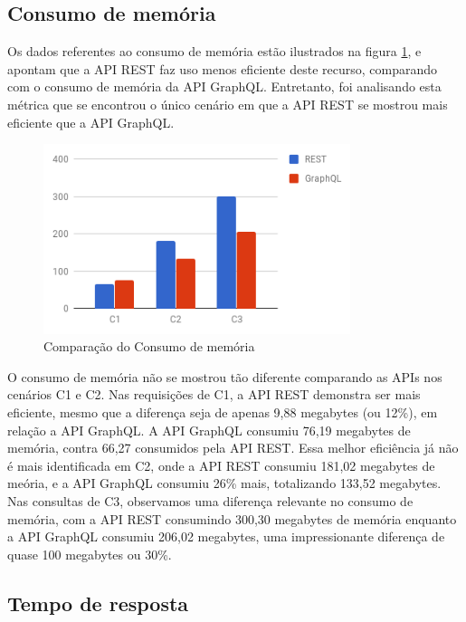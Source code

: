 \subsection{Consumo de memória}

Os dados referentes ao consumo de memória estão ilustrados na figura \ref{fig:q2-mem}, e apontam que a API REST faz uso menos eficiente deste recurso, comparando com o consumo de memória da API GraphQL. Entretanto, foi analisando esta métrica que se encontrou o único cenário em que a API REST se mostrou mais eficiente que a API GraphQL.

\begin{figure}[htbp]
    \centering
    \includegraphics[width=0.8\textwidth]{figuras/q2-memory.png}
    \caption{Comparação do Consumo de memória}
    \label{fig:q2-mem}
    \author{fonte: Autor}
\end{figure}

O consumo de memória não se mostrou tão diferente comparando as APIs nos cenários C1 e C2. Nas requisições de C1, a API REST demonstra ser mais eficiente, mesmo que a diferença seja de apenas 9,88 megabytes (ou 12\%), em relação a API GraphQL. A API GraphQL consumiu 76,19 megabytes de memória, contra 66,27 consumidos pela API REST. Essa melhor eficiência já não é mais identificada em C2, onde a API REST consumiu 181,02 megabytes de meória, e a API GraphQL consumiu 26\% mais, totalizando 133,52 megabytes. Nas consultas de C3, observamos uma diferença relevante no consumo de memória, com a API REST consumindo 300,30 megabytes de memória enquanto a API GraphQL consumiu 206,02 megabytes, uma impressionante diferença de quase 100 megabytes ou 30\%.

\subsection{Tempo de resposta}

